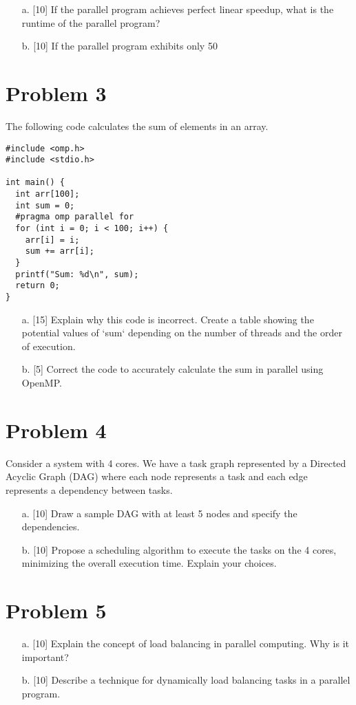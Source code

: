 \documentclass{article}
\begin{document}
\begin{enumerate}
    \item[a.] [10] If the parallel program achieves perfect linear speedup, what is the runtime of the parallel program?
    \item[b.] [10]  If the parallel program exhibits only 50%
\end{enumerate}


\section*{Problem 3}
The following code calculates the sum of elements in an array.

\begin{verbatim}
#include <omp.h>
#include <stdio.h>

int main() {
  int arr[100];
  int sum = 0;
  #pragma omp parallel for
  for (int i = 0; i < 100; i++) {
    arr[i] = i;
    sum += arr[i];
  }
  printf("Sum: %d\n", sum);
  return 0;
}
\end{verbatim}

\begin{enumerate}
    \item[a.] [15]  Explain why this code is incorrect. Create a table showing the potential values of `sum` depending on the number of threads and the order of execution.
    \item[b.] [5] Correct the code to accurately calculate the sum in parallel using OpenMP.
\end{enumerate}


\section*{Problem 4}
Consider a system with 4 cores. We have a task graph represented by a Directed Acyclic Graph (DAG) where each node represents a task and each edge represents a dependency between tasks.

\begin{enumerate}
    \item[a.] [10]  Draw a sample DAG with at least 5 nodes and specify the dependencies.
    \item[b.] [10]  Propose a scheduling algorithm to execute the tasks on the 4 cores, minimizing the overall execution time. Explain your choices.
\end{enumerate}


\section*{Problem 5}
\begin{enumerate}
    \item[a.] [10] Explain the concept of load balancing in parallel computing.  Why is it important?
    \item[b.] [10] Describe a technique for dynamically load balancing tasks in a parallel program.
\end{enumerate}
\end{document}
